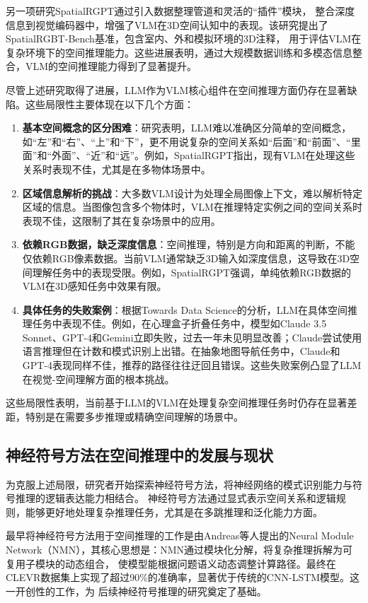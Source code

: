 另一项研究SpatialRGPT\cite{cheng2024spatialrgptgroundedspatialreasoning}通过引入数据整理管道和灵活的“插件”模块，
整合深度信息到视觉编码器中，增强了VLM在3D空间认知中的表现。该研究提出了SpatialRGBT-Bench基准，包含室内、外和模拟环境的3D注释，
用于评估VLM在复杂环境下的空间推理能力。这些进展表明，通过大规模数据训练和多模态信息整合，VLM的空间推理能力得到了显著提升。

尽管上述研究取得了进展，LLM作为VLM核心组件在空间推理方面仍存在显著缺陷。这些局限性主要体现在以下几个方面：
\begin{enumerate}
\item \textbf{基本空间概念的区分困难}：研究表明，LLM难以准确区分简单的空间概念，如“左”和“右”、“上”和“下”，更不用说复杂的空间关系如“后面”和“前面”、“里面”和“外面”、“近”和“远”。例如，SpatialRGPT指出，现有VLM在处理这些关系时表现不佳，尤其是在多物体场景中。
\item \textbf{区域信息解析的挑战}：大多数VLM设计为处理全局图像上下文，难以解析特定区域的信息。当图像包含多个物体时，VLM在推理特定实例之间的空间关系时表现不佳，这限制了其在复杂场景中的应用。
\item \textbf{依赖RGB数据，缺乏深度信息}：空间推理，特别是方向和距离的判断，不能仅依赖RGB像素数据。当前VLM通常缺乏3D输入如深度信息，这导致在3D空间理解任务中的表现受限。例如，SpatialRGPT强调，单纯依赖RGB数据的VLM在3D感知任务中效果有限。
\item \textbf{具体任务的失败案例}：根据Towards Data Science的分析，LLM在具体空间推理任务中表现不佳。例如，在心理盒子折叠任务中，模型如Claude 3.5 Sonnet、GPT-4和Gemini立即失败，过去一年未见明显改善；Claude尝试使用语言推理但在计数和模式识别上出错。在抽象地图导航任务中，Claude和GPT-4表现同样不佳，推荐的路径往往迂回且错误。这些失败案例凸显了LLM在视觉-空间理解方面的根本挑战。
\end{enumerate}

这些局限性表明，当前基于LLM的VLM在处理复杂空间推理任务时仍存在显著差距，特别是在需要多步推理或精确空间理解的场景中。
\subsection{神经符号方法在空间推理中的发展与现状}
为克服上述局限，研究者开始探索神经符号方法，将神经网络的模式识别能力与符号推理的逻辑表达能力相结合。
神经符号方法通过显式表示空间关系和逻辑规则，能够更好地处理复杂推理任务，尤其是在多跳推理和泛化能力方面。

最早将神经符号方法用于空间推理的工作是由Andreas等人\cite{andreas2016neural}提出的Neural Module Network（NMN），其核心思想是：NMN通过模块化分解，将复杂推理拆解为可复用子模块的动态组合，
使模型能根据问题语义动态调整计算路径。最终在CLEVR数据集上实现了超过90\%的准确率，显著优于传统的CNN-LSTM模型。这一开创性的工作，为
后续神经符号推理的研究奠定了基础。

